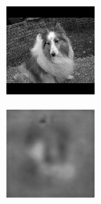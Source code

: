 \begin{figure}[H]
  \setcounter{subfigure}{0}
  \begin{subfigure}[t]{0.13\textwidth}
    \centering
    \includegraphics[width=\linewidth]{img/one-trial/stimulus_2.png}
  \end{subfigure}
  \begin{subfigure}[t]{0.13\textwidth}
    \centering
    \includegraphics[width=\linewidth]{img/one-trial/prediction_2_l1.png}

\end{subfigure}
\end{figure}
